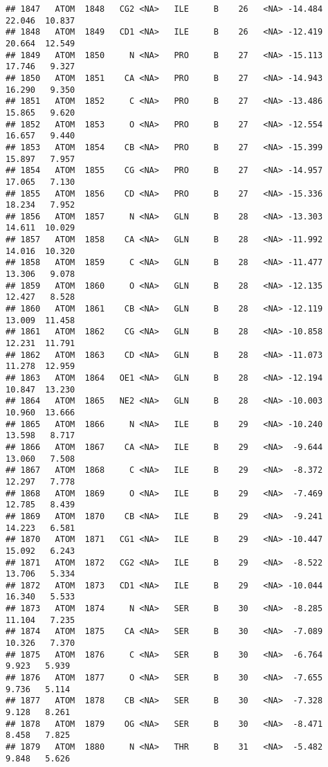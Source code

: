 \documentclass[
]{article}
\begin{document}
\begin{verbatim}
## 1847   ATOM  1848   CG2 <NA>   ILE     B    26   <NA> -14.484  22.046  10.837
## 1848   ATOM  1849   CD1 <NA>   ILE     B    26   <NA> -12.419  20.664  12.549
## 1849   ATOM  1850     N <NA>   PRO     B    27   <NA> -15.113  17.746   9.327
## 1850   ATOM  1851    CA <NA>   PRO     B    27   <NA> -14.943  16.290   9.350
## 1851   ATOM  1852     C <NA>   PRO     B    27   <NA> -13.486  15.865   9.620
## 1852   ATOM  1853     O <NA>   PRO     B    27   <NA> -12.554  16.657   9.440
## 1853   ATOM  1854    CB <NA>   PRO     B    27   <NA> -15.399  15.897   7.957
## 1854   ATOM  1855    CG <NA>   PRO     B    27   <NA> -14.957  17.065   7.130
## 1855   ATOM  1856    CD <NA>   PRO     B    27   <NA> -15.336  18.234   7.952
## 1856   ATOM  1857     N <NA>   GLN     B    28   <NA> -13.303  14.611  10.029
## 1857   ATOM  1858    CA <NA>   GLN     B    28   <NA> -11.992  14.016  10.320
## 1858   ATOM  1859     C <NA>   GLN     B    28   <NA> -11.477  13.306   9.078
## 1859   ATOM  1860     O <NA>   GLN     B    28   <NA> -12.135  12.427   8.528
## 1860   ATOM  1861    CB <NA>   GLN     B    28   <NA> -12.119  13.009  11.458
## 1861   ATOM  1862    CG <NA>   GLN     B    28   <NA> -10.858  12.231  11.791
## 1862   ATOM  1863    CD <NA>   GLN     B    28   <NA> -11.073  11.278  12.959
## 1863   ATOM  1864   OE1 <NA>   GLN     B    28   <NA> -12.194  10.847  13.230
## 1864   ATOM  1865   NE2 <NA>   GLN     B    28   <NA> -10.003  10.960  13.666
## 1865   ATOM  1866     N <NA>   ILE     B    29   <NA> -10.240  13.598   8.717
## 1866   ATOM  1867    CA <NA>   ILE     B    29   <NA>  -9.644  13.060   7.508
## 1867   ATOM  1868     C <NA>   ILE     B    29   <NA>  -8.372  12.297   7.778
## 1868   ATOM  1869     O <NA>   ILE     B    29   <NA>  -7.469  12.785   8.439
## 1869   ATOM  1870    CB <NA>   ILE     B    29   <NA>  -9.241  14.223   6.581
## 1870   ATOM  1871   CG1 <NA>   ILE     B    29   <NA> -10.447  15.092   6.243
## 1871   ATOM  1872   CG2 <NA>   ILE     B    29   <NA>  -8.522  13.706   5.334
## 1872   ATOM  1873   CD1 <NA>   ILE     B    29   <NA> -10.044  16.340   5.533
## 1873   ATOM  1874     N <NA>   SER     B    30   <NA>  -8.285  11.104   7.235
## 1874   ATOM  1875    CA <NA>   SER     B    30   <NA>  -7.089  10.326   7.370
## 1875   ATOM  1876     C <NA>   SER     B    30   <NA>  -6.764   9.923   5.939
## 1876   ATOM  1877     O <NA>   SER     B    30   <NA>  -7.655   9.736   5.114
## 1877   ATOM  1878    CB <NA>   SER     B    30   <NA>  -7.328   9.128   8.261
## 1878   ATOM  1879    OG <NA>   SER     B    30   <NA>  -8.471   8.458   7.825
## 1879   ATOM  1880     N <NA>   THR     B    31   <NA>  -5.482   9.848   5.626

\end{verbatim}
\end{document}

